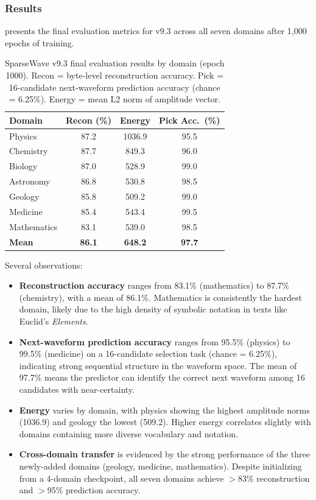 \documentclass[10pt,twocolumn]{article}
\begin{document}
\subsubsection{Results}

 presents the final evaluation metrics for v9.3 across all seven domains after 1,000 epochs of training.

\begin{table}[t]
\centering
\caption{SparseWave v9.3 final evaluation results by domain (epoch 1000). Recon = byte-level reconstruction accuracy. Pick = 16-candidate next-waveform prediction accuracy (chance = 6.25\%). Energy = mean L2 norm of amplitude vector.}
\label{tab:v93_results}
\small
\begin{tabular}{@{}lccc@{}}
\toprule
\textbf{Domain} & \textbf{Recon (\%)} & \textbf{Energy} & \textbf{Pick Acc.\ (\%)} \\
\midrule
Physics     & 87.2 & 1036.9 & 95.5 \\
Chemistry   & 87.7 & 849.3  & 96.0 \\
Biology     & 87.0 & 528.9  & 99.0 \\
Astronomy   & 86.8 & 530.8  & 98.5 \\
Geology     & 85.8 & 509.2  & 99.0 \\
Medicine    & 85.4 & 543.4  & 99.5 \\
Mathematics & 83.1 & 539.0  & 98.5 \\
\midrule
\textbf{Mean} & \textbf{86.1} & \textbf{648.2} & \textbf{97.7} \\
\bottomrule
\end{tabular}
\end{table}

Several observations:
\begin{itemize}[leftmargin=*,nosep]
    \item \textbf{Reconstruction accuracy} ranges from 83.1\% (mathematics) to 87.7\% (chemistry), with a mean of 86.1\%. Mathematics is consistently the hardest domain, likely due to the high density of symbolic notation in texts like Euclid's \emph{Elements}.
    \item \textbf{Next-waveform prediction accuracy} ranges from 95.5\% (physics) to 99.5\% (medicine) on a 16-candidate selection task (chance = 6.25\%), indicating strong sequential structure in the waveform space. The mean of 97.7\% means the predictor can identify the correct next waveform among 16 candidates with near-certainty.
    \item \textbf{Energy} varies by domain, with physics showing the highest amplitude norms (1036.9) and geology the lowest (509.2). Higher energy correlates slightly with domains containing more diverse vocabulary and notation.
    \item \textbf{Cross-domain transfer} is evidenced by the strong performance of the three newly-added domains (geology, medicine, mathematics). Despite initializing from a 4-domain checkpoint, all seven domains achieve $>$83\% reconstruction and $>$95\% prediction accuracy.
\end{itemize}
\end{document}
